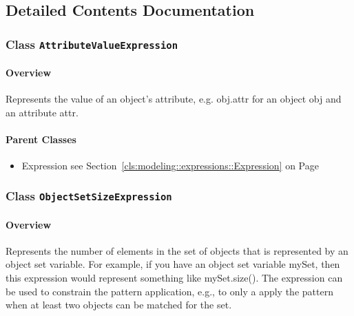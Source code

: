 			
		



\subsection{Detailed Contents Documentation}
\subsubsection{\Large{Class \bfseries \texttt{AttributeValueExpression}\normalfont}}
\label{cls:modeling::patterns::expressions::AttributeValueExpression} 
\paragraph{Overview}

	
			
Represents the value of an object's attribute, e.g. obj.attr for an object obj and an attribute attr.	
		
	



\paragraph{Parent Classes}
\begin{itemize}
\item Expression see Section~\ref{cls:modeling::expressions::Expression} on Page~\pageref{cls:modeling::expressions::Expression}\end{itemize}
\subsubsection{\Large{Class \bfseries \texttt{ObjectSetSizeExpression}\normalfont}}
\label{cls:modeling::patterns::expressions::ObjectSetSizeExpression} 
\paragraph{Overview}

	
			
Represents the number of elements in the set of objects that is represented by an object set variable. For example, if you have an object set variable mySet, then this expression would represent something like mySet.size(). The expression can be used to constrain the pattern application, e.g., to only a apply the pattern when at least two objects can be matched for the set.	
		
